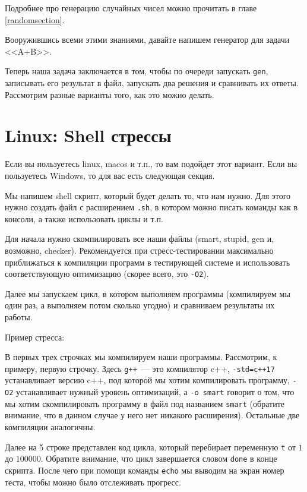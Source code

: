 Подробнее про генерацию случайных чисел можно прочитать в главе \ref{randomsection}.

Вооружившись всеми этими знаниями, давайте напишем генератор для задачи <<A+B>>.



Теперь наша задача заключается в том, чтобы по очереди запускать \verb+gen+, записывать его результат в файл, запускать два решения и сравнивать их ответы. Рассмотрим разные варианты того, как это можно делать.

\section{Linux: Shell стрессы}

Если вы пользуетесь linux, macos и т.п., то вам подойдет этот вариант. Если вы пользуетесь Windows, то для вас есть следующая секция.

Мы напишем shell скрипт, который будет делать то, что нам нужно. Для этого нужно создать файл с расширением \verb+.sh+, в котором можно писать команды как в консоли, а также использовать циклы и т.п.

Для начала нужно скомпилировать все наши файлы (smart, stupid, gen и, возможно, checker). Рекомендуется при стресс-тестировании максимально приближаться к компиляции программ в тестирующей системе и использовать соответствующую оптимизацию (скорее всего, это \verb+-O2+).

Далее мы запускаем цикл, в котором выполняем программы (компилируем мы один раз, а выполняем потом сколько угодно) и сравниваем результаты их работы.

Пример стресса:



В первых трех строчках мы компилируем наши программы. Рассмотрим, к примеру, первую строчку. Здесь \verb^g++^~--- это компилятор c++, \verb^-std=c++17^ устанавливает версию c++, под которой мы хотим компилировать программу, \verb+-O2+ устанавливает нужный уровень оптимизаций, а \verb+-o smart+ говорит о том, что мы хотим скомпилировать программу в файл под названием \verb+smart+ (обратите внимание, что в данном случае у него нет никакого расширения). Остальные две компиляции аналогичны.

Далее на 5 строке представлен код цикла, который перебирает переменную \verb+t+ от $1$ до $100000$. Обратите внимание, что цикл завершается словом \verb+done+ в конце скрипта. После чего при помощи команды \verb+echo+ мы выводим на экран номер теста, чтобы можно было отслеживать прогресс.

